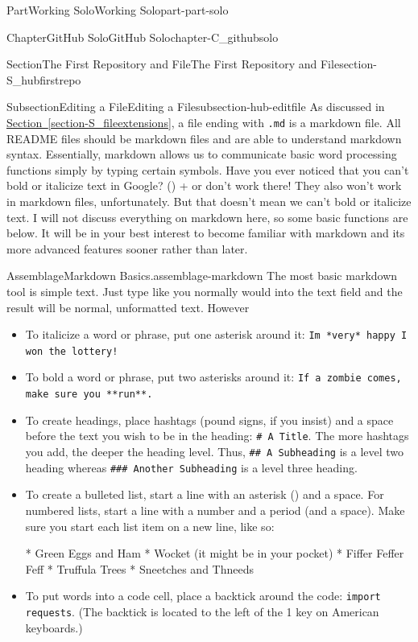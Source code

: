 \documentclass[oneside,10pt,]{book}
\newcommand{\xreffont}{\relax}
\newcommand{\mono}[1]{\texttt{#1}}
\newcommand{\kbd}[1]{\keys{{#1}}}
\begin{document}
\begin{partptx}{Part}{Working Solo}{}{Working Solo}{}{}{part-part-solo}
\begin{chapterptx}{Chapter}{GitHub Solo}{}{GitHub Solo}{}{}{chapter-C_githubsolo}
\begin{sectionptx}{Section}{The First Repository and File}{}{The First Repository and File}{}{}{section-S_hubfirstrepo}
\begin{subsectionptx}{Subsection}{Editing a File}{}{Editing a File}{}{}{subsection-hub-editfile}
As discussed in \hyperref[section-S_fileextensions]{Section~{\xreffont\ref{section-S_fileextensions}}}, a file ending with \mono{.md} is a markdown file. All README files should be markdown files and are able to understand markdown syntax. Essentially, markdown allows us to communicate basic word processing functions simply by typing certain symbols. Have you ever noticed that you can't bold or italicize text in Google? \kbd{Control} (\kbd{Command}) + \kbd{B} or \kbd{I} don't work there! They also won't work in markdown files, unfortunately. But that doesn't mean we can't bold or italicize text. I will not discuss everything on markdown here, so some basic functions are below. It will be in your best interest to become familiar with markdown and its more advanced features sooner rather than later.%
\begin{assemblage}{Assemblage}{Markdown Basics.}{assemblage-markdown}%
The most basic markdown tool is simple text. Just type like you normally would into the text field and the result will be normal, unformatted text. However\textellipsis{}%
\begin{itemize}[label=\textbullet]
\item{}To italicize a word or phrase, put one asterisk around it: \mono{I\textquotesingle{}m *very* happy I won the lottery!}%
\item{}To bold a word or phrase, put two asterisks around it: \mono{If a zombie comes, make sure you **run**.}%
\item{}To create headings, place hashtags (pound signs, if you insist) and a space before the text you wish to be in the heading: \mono{\# A Title}. The more hashtags you add, the deeper the heading level. Thus, \mono{\#\# A Subheading} is a level two heading whereas \mono{\#\#\# Another Subheading} is a level three heading.%
\item{}To create a bulleted list, start a line with an asterisk (\textasteriskcentered{}) and a space. For numbered lists, start a line with a number and a period (and a space). Make sure you start each list item on a new line, like so:%
\begin{codedisplay}
* Green Eggs and Ham
* Wocket (it might be in your pocket)
* Fiffer Feffer Feff
* Truffula Trees
* Sneetches and Thneeds
\end{codedisplay}
%
\item{}To put words into a code cell, place a backtick around the code: \mono{\textasciigrave{}import requests\textasciigrave{}}. (The backtick is located to the left of the 1 key on American keyboards.)%

\end{itemize}
\end{assemblage}
\end{subsectionptx}
\end{sectionptx}
\end{chapterptx}
\end{partptx}
\end{document}
